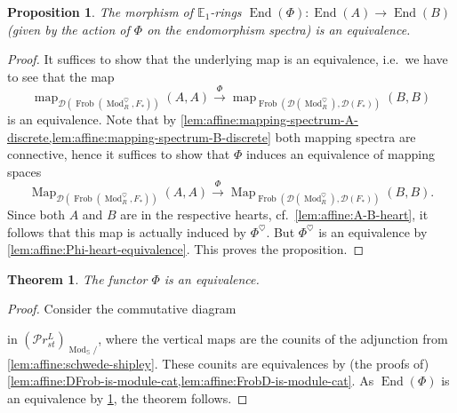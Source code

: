 \documentclass{article}
\theoremstyle{definition}
\theoremstyle{definition}
\theoremstyle{definition}
\theoremstyle{plain}
\theoremstyle{plain}
\theoremstyle{plain}
\theoremstyle{plain}
\newtheorem{thm}[defn]{Theorem}
\theoremstyle{plain}
\theoremstyle{plain}
\newtheorem{prop}[defn]{Proposition}
\theoremstyle{plain}
\theoremstyle{plain}
\theoremstyle{remark}
\theoremstyle{remark}
\theoremstyle{plain}
\theoremstyle{plain}
\theoremstyle{plain}
\theoremstyle{plain}
\theoremstyle{plain}
\newcommand{\Mod}[1]{\operatorname{Mod}_{#1}}
\newcommand{\ModDisc}[1]{\operatorname{Mod}_{#1}^{\heartsuit}}
\newcommand{\Frob}[2]{\operatorname{Frob}(#1, #2)}
\newcommand{\End}[1]{\operatorname{End}(#1)}
\renewcommand{\S}{\mathbb{S}}
\newcommand{\Cat}[1]{\mathcal{#1}}
\newcommand{\Map}[3]{\operatorname{Map}_{#1}({#2}, {#3})} %
\newcommand{\map}[3]{\operatorname{map}_{#1}({#2}, {#3})} %
\newcommand{\PrSt}{\mathcal{P}r^{L}_{st}}
\begin{document}
\begin{prop} \label{lem:affine:eta-equivalence}
    The morphism of $\mathbb{E}_1$-rings $\End{\Phi} \colon \End{A} \to \End{B}$ (given by the action of $\Phi$ on the endomorphism spectra) is an equivalence.
\end{prop}
\begin{proof}
    It suffices to show that the underlying map is an equivalence, i.e.\ we have to see that the map 
    \begin{equation*}
        \map{\Cat{D}(\Frob{\ModDisc{R}}{F_*})}{A}{A} \xrightarrow{\Phi} \map{\Frob{\Cat D(\ModDisc{R})}{\Cat D(F_*)}}{B}{B}
    \end{equation*}
    is an equivalence.
    Note that by \cref{lem:affine:mapping-spectrum-A-discrete,lem:affine:mapping-spectrum-B-discrete} both mapping spectra are connective, hence it suffices to show that $\Phi$ 
    induces an equivalence of mapping spaces 
    \begin{equation*}
        \Map{\Cat{D}(\Frob{\ModDisc{R}}{F_*})}{A}{A} \xrightarrow{\Phi} \Map{\Frob{\Cat D(\ModDisc{R})}{\Cat D(F_*)}}{B}{B}.
    \end{equation*}
    Since both $A$ and $B$ are in the respective hearts, cf.\ \cref{lem:affine:A-B-heart},
    it follows that this map is actually induced by $\Phi^\heartsuit$.
    But $\Phi^\heartsuit$ is an equivalence by \cref{lem:affine:Phi-heart-equivalence}.
    This proves the proposition.
\end{proof}

\begin{thm} \label{lem:affine:main-thm}
    The functor $\Phi$ is an equivalence.
\end{thm}
\begin{proof}
    Consider the commutative diagram
    \begin{center}
    \end{center}
    in ${(\PrSt)}_{{\Mod{\S}}/}$,
    where the vertical maps are the counits of the adjunction from \cref{lem:affine:schwede-shipley}.
    These counits are equivalences by (the proofs of) \cref{lem:affine:DFrob-is-module-cat,lem:affine:FrobD-is-module-cat}.
    As $\End{\Phi}$ is an equivalence by \cref{lem:affine:eta-equivalence},
    the theorem follows.
\end{proof}
\end{document}
